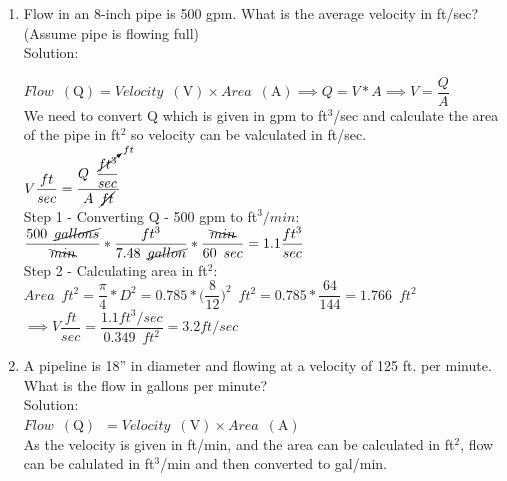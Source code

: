 \documentclass{article}
\begin{document}
\begin{enumerate}
\item Flow in an 8-inch pipe is 500 gpm. What is the average velocity in ft/sec? (Assume pipe is flowing full)\\
Solution:\\
\vspace{0.2cm}

$Flow \enspace(\mathrm{Q})= Velocity \enspace(\mathrm{V})  \times Area \enspace(\mathrm{A}) \implies Q=V*A \implies V=\dfrac{Q}{A}$\\
We need to convert Q which is given in gpm to ft${^3}$/sec and calculate the area of the pipe in ft${^2}$ so velocity can be valculated in ft/sec.\\
\vspace{0.2cm}
$ V \dfrac{ft}{sec} = \dfrac{Q \enspace \dfrac{\cancelto{ft}{ft^3}}{sec}}{A \enspace\cancel{ft}}$\\
\vspace{0.2cm}
Step 1 - Converting Q - 500 gpm to ft${^3}/min$:\\
\vspace{0.2cm}
$\dfrac{500 \enspace \cancel{gallons}}{\bcancel{min}}*\dfrac{ft^3}{7.48 \enspace \cancel{gallon}}*\dfrac{\bcancel{min}}{60 \enspace sec}=1.1\dfrac{ft^3}{sec}$\\
\vspace{0.2cm}
Step 2 - Calculating area in ft${^2}$:\\
\vspace{0.2cm}
$Area \enspace ft^2= \dfrac{\pi}{4}*D^2= 0.785*\Big(\dfrac{8}{12}\Big)^2 \enspace ft^2=0.785*\dfrac{64}{144}=1.766 \enspace ft^2$\\
\vspace{0.2cm}
$\implies V \dfrac{ft}{sec} = \dfrac{ 1.1 ft^3/sec}{0.349 \enspace ft^2} = \boxed{3.2 ft/sec}$\\
\vspace{0.3cm} 


\item A pipeline is 18” in diameter and flowing at a velocity of 125 ft. per minute. What is the flow in gallons per minute?\\
\vspace{0.2cm}
Solution:\\
$Flow \enspace(\mathrm{Q}) \enspace = Velocity \enspace(\mathrm{V})  \times Area \enspace(\mathrm{A})$\\
\vspace{0.2cm}
As the velocity is given in ft/min, and the area can be calculated in ft$^2$, flow can be calulated in ft$^3$/min and then converted to gal/min.\\
\vspace{0.2cm}


\end{enumerate}
\end{document}
